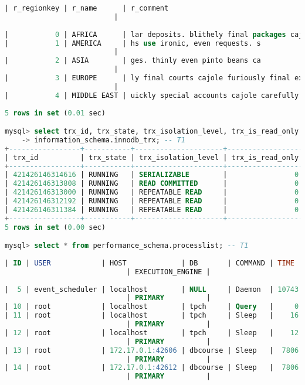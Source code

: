 \documentclass{article}
\begin{document}
\begin{lstlisting}[language=sql]
| r_regionkey | r_name      | r_comment
                          |
    
|           0 | AFRICA      | lar deposits. blithely final packages cajole. regular waters are final requests. regular accounts are according to  |
|           1 | AMERICA     | hs use ironic, even requests. s
                          |
|           2 | ASIA        | ges. thinly even pinto beans ca
                          |
|           3 | EUROPE      | ly final courts cajole furiously final excuse
                          |
|           4 | MIDDLE EAST | uickly special accounts cajole carefully blithely close requests. carefully final asymptotes haggle furiousl        |
    
5 rows in set (0.01 sec)

mysql> select trx_id, trx_state, trx_isolation_level, trx_is_read_only from
    -> information_schema.innodb_trx; -- T1
+-----------------+-----------+---------------------+------------------+
| trx_id          | trx_state | trx_isolation_level | trx_is_read_only |
+-----------------+-----------+---------------------+------------------+
| 421426146314616 | RUNNING   | SERIALIZABLE        |                0 |
| 421426146313808 | RUNNING   | READ COMMITTED      |                0 |
| 421426146313000 | RUNNING   | REPEATABLE READ     |                0 |
| 421426146312192 | RUNNING   | REPEATABLE READ     |                0 |
| 421426146311384 | RUNNING   | REPEATABLE READ     |                0 |
+-----------------+-----------+---------------------+------------------+
5 rows in set (0.00 sec)

mysql> select * from performance_schema.processlist; -- T1
    
| ID | USER            | HOST             | DB       | COMMAND | TIME  | STATE                  | INFO
                             | EXECUTION_ENGINE |
    
|  5 | event_scheduler | localhost        | NULL     | Daemon  | 10743 | Waiting on empty queue | NULL
                             | PRIMARY          |
| 10 | root            | localhost        | tpch     | Query   |     0 | executing              | select * from performance_schema.processlist -- T1 | PRIMARY          |
| 11 | root            | localhost        | tpch     | Sleep   |    16 |                        | NULL
                             | PRIMARY          |
| 12 | root            | localhost        | tpch     | Sleep   |    12 |                        | NULL
                             | PRIMARY          |
| 13 | root            | 172.17.0.1:42606 | dbcourse | Sleep   |  7806 |                        | NULL
                             | PRIMARY          |
| 14 | root            | 172.17.0.1:42612 | dbcourse | Sleep   |  7806 |                        | NULL
                             | PRIMARY          |
    

\end{lstlisting}
\end{document}
